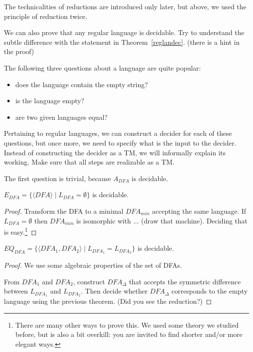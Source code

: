 The technicalities of reductions are introduced only later, but
above, we used the principle of reduction twice.

We can also prove that any regular language is decidable. Try to
understand the subtle difference with the statement in
Theorem~\ref{reglandec}. (there is a hint in the proof)


The following three questions about a language are quite popular:
\begin{itemize}
\item does the language contain the empty string?
\item is the language empty?
\item are two given languages equal?
\end{itemize}

Pertaining to regular languages, we can construct a decider for each
of these questions, but once more, we need to specify what is the
input to the decider. Instead of constructing the decider as a TM, we
will informally explain its working. Make sure that all steps are
realizable as a TM.


The first question is trivial, because $A_{DFA}$ is decidable.

\begin{theorem}
$E_{DFA} = \{\langle DFA \rangle\mid L_{DFA} = \emptyset\}$ is decidable.
\end{theorem}
\begin{proof}
Transform the DFA to a minimal $DFA_{min}$ accepting the same language.
If $L_{DFA} = \emptyset$ then $DFA_{min}$ is isomorphic with ... (draw that
machine). Deciding that is easy.\footnote{There are many other ways to prove this. We used some theory we studied before, but is also a bit overkill: you are invited to find shorter and/or more elegant ways.}
\end{proof}

\begin{theorem}
$EQ_{DFA} = \{\langle DFA_1,DFA_2 \rangle\mid L_{DFA_1} = L_{DFA_2}\}$ is decidable.
\end{theorem}
\begin{proof}
We use some algebraic properties of the set of DFAs.

From $DFA_1$ and $DFA_2$, construct $DFA_\Delta$ that accepts the
symmetric difference between $L_{DFA_1}$ and $L_{DFA_2}$. Then decide
whether $DFA_\Delta$ corresponds to the empty language using the previous
theorem. (Did you see the reduction?)
\end{proof}


